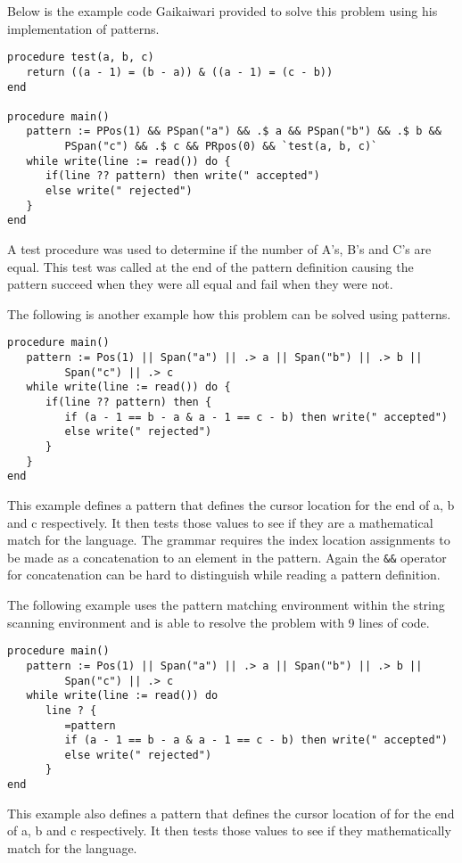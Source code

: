 \documentclass{article}
\begin{document}
Below is the example code Gaikaiwari provided to solve this problem using his implementation of patterns.  
\begin{verbatim}
procedure test(a, b, c)
   return ((a - 1) = (b - a)) & ((a - 1) = (c - b))
end

procedure main()
   pattern := PPos(1) && PSpan("a") && .$ a && PSpan("b") && .$ b && 
         PSpan("c") && .$ c && PRpos(0) && `test(a, b, c)`
   while write(line := read()) do {
      if(line ?? pattern) then write(" accepted")
      else write(" rejected")
   }
end
\end{verbatim}
A test procedure was used to determine if the number of A's, B's and C's are equal.  This test was called at the end of the pattern definition causing the pattern succeed when they were all equal and fail when they were not.

The following is another example how this problem can be solved using patterns.
\begin{verbatim}
procedure main()
   pattern := Pos(1) || Span("a") || .> a || Span("b") || .> b || 
         Span("c") || .> c
   while write(line := read()) do {
      if(line ?? pattern) then {
         if (a - 1 == b - a & a - 1 == c - b) then write(" accepted")
         else write(" rejected")
      }
   }
end
\end{verbatim}
This example defines a pattern that defines the cursor location for the end of a, b and c respectively.  It then tests those values to see if they are a mathematical match for the language.  The grammar requires the index location assignments to be made as a concatenation to an element in the pattern.  Again the \texttt{\&\&} operator for concatenation can be hard to distinguish while reading a pattern definition.

The following example uses the pattern matching environment within the string scanning environment and is able to resolve the problem with 9 lines of code.
\begin{verbatim}
procedure main()
   pattern := Pos(1) || Span("a") || .> a || Span("b") || .> b ||
         Span("c") || .> c 
   while write(line := read()) do
      line ? {
         =pattern
         if (a - 1 == b - a & a - 1 == c - b) then write(" accepted")
         else write(" rejected")
      }
end
\end{verbatim}
This example also defines a pattern that defines the cursor location of for the end of a, b and c respectively.  It then tests those values to see if they mathematically match for the language.
\end{document}
